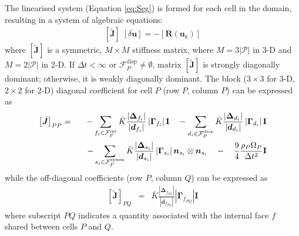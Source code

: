 \documentclass[sn-mathphys,Numbered]{sn-jnl}%
\newcommand{\bb}{\boldsymbol}
\begin{document}
The linearised system (Equation \ref{eq:Seg}) is formed for each cell in the domain, resulting in a system of algebraic equations:
\begin{eqnarray} \label{eq:SegSys}
    \left[ \bb{\tilde{J}} \right]  \; \left[ \delta \bb{u} \right] = - \left[\bb{R}(\bb{u}_k)\right]
\end{eqnarray}
where $\left[ \bb{\tilde{J}} \right]$ is a symmetric, $M \times M$ stiffness matrix, where $M = 3|\mathcal{P}|$ in 3-D and $M = 2|\mathcal{P}|$ in 2-D.
If $\Delta t < \infty$ or $\mathcal{F}^{\text{disp}}_P \neq \emptyset$, matrix $\left[ \bb{\tilde{J}} \right]$ is strongly diagonally dominant; otherwise, it is weakly diagonally dominant.
The block ($3\times3$ for 3-D, $2\times2$ for 2-D) diagonal coefficient for cell $P$ (row $P$, column $P$) can be expressed as
\begin{eqnarray}
	 \left[ \tilde{\bb{J}}\right]_{PP} &=&
		- \sum_{f_i \in \mathcal{F}^{\text{int}}_P}  \bar{K}
		\frac{ \left|\bb{\Delta}_{f_i} \right| }{\left|\bb{d}_{f_i}\right|}    \left|\bb{\Gamma}_{f_i}\right| \textbf{I} 
	    \quad-  \sum_{d_i \in \mathcal{F}^{\text{disp}}_P}  \bar{K}
		 \frac{ \left|\bb{\Delta}_{d_i} \right| }{\left|\bb{d}_{d_i}\right|} 
		\left|\bb{\Gamma}_{d_i}\right| \textbf{I} \notag \\
	 &&\quad - \sum_{s_i \in \mathcal{F}^{\text{symm}}_P}  \bar{K}
		 \frac{ \left|\bb{\Delta}_{s_i} \right|}{\left|\bb{d}_{s_i}\right|}
		\left|\bb{\Gamma}_{s_i}\right|  \bb{n}_{s_i} \otimes \bb{n}_{s_i} 
	\quad - \quad \frac{9}{4}  \frac{\rho_P \Omega_P}{\Delta t^2} \textbf{I}
\end{eqnarray}
while the off-diagonal coefficients (row $P$, column $Q$) can be expressed as
\begin{eqnarray}
	\left[\tilde{\bb{J}}\right] _{PQ} &=&
		\bar{K} \frac{ \left|\bb{\Delta}_{f_{PQ}} \right| }{\left|\bb{d}_{f_{PQ}}\right|}    \left|\bb{\Gamma}_{f_{PQ}}\right| \textbf{I} 
\end{eqnarray}
where subscript $PQ$ indicates a quantity associated with the internal face $f$ shared between cells $P$ and $Q$.
\end{document}
